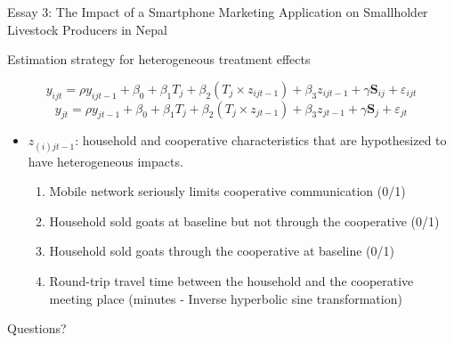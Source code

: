 \documentclass[aspectratio=169]{beamer}
\newenvironment{wideitemize}{\itemize\addtolength{\itemsep}{10pt}}{\enditemize}
\begin{document}
\begin{frame}{Essay 3: The Impact of a Smartphone Marketing Application on Smallholder Livestock Producers in Nepal}

\begin{wideitemize}
    \item Estimation strategy for heterogeneous treatment effects

\begin{equation} \label{eq:HTE1}
y_{ijt} = \rho y_{ijt-1} + \beta_{0} + \beta_{1} T_{j} + \beta_{2} (T_{j} \times z_{ijt-1}) + \beta_3 z_{ijt-1} + \gamma \textbf{S}_{ij} + \varepsilon_{ijt}
\end{equation}
\begin{equation} \label{eq:HTE2}
y_{jt} = \rho y_{jt-1} + \beta_{0} + \beta_{1} T_{j} + \beta_{2} (T_{j} \times z_{jt-1}) + \beta_3 z_{jt-1} + \gamma \textbf{S}_{j} + \varepsilon_{jt}
\end{equation}

    \vspace{.25cm}
    \begin{itemize}
        \item $z_{(i)jt-1}$: household and cooperative characteristics that are hypothesized to have heterogeneous impacts. \vspace{.25cm}
            \begin{enumerate}
                \item Mobile network seriously limits cooperative communication (0/1)
                \item Household sold goats at baseline but not through the cooperative (0/1)
                \item Household sold goats through the cooperative at baseline (0/1)
                \item Round-trip travel time between the household and the cooperative meeting place (minutes - Inverse hyperbolic sine transformation)
            \end{enumerate}
    \end{itemize}
\end{wideitemize}

\end{frame}



\begin{frame}
\Huge{\centerline{Questions?}}
\end{frame}
\end{document}
